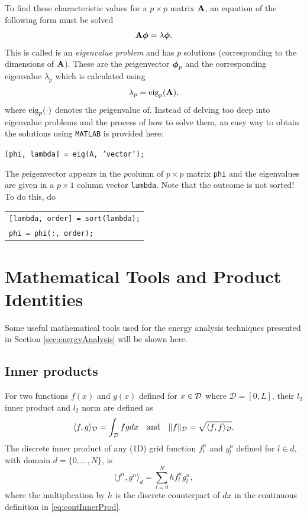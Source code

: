 To find these characteristic values for a $p\times p$ matrix $\mathbf{A}$, an equation of the following form must be solved 
\begin{equation}
    \mathbf{A} \boldsymbol{\phi} = \lambda \boldsymbol{\phi}.
\end{equation}
This is called is an \textit{eigenvalue problem} and has $p$ solutions (corresponding to the dimensions of $\mathbf{A}$). These are the $p$\th eigenvector $\boldsymbol{\phi}_p$ and the corresponding eigenvalue $\lambda_p$ which is calculated using
\begin{equation}
    \lambda_p = \text{eig}_p(\mathbf{A}),
\end{equation}
where $\text{eig}_p(\cdot)$ denotes the $p$\th eigenvalue of. Instead of delving too deep into eigenvalue problems and the process of how to solve them, an easy way to obtain the solutions using \texttt{MATLAB} is provided here:

\begin{center}
    \texttt{[phi, lambda] = eig(A, {\color[HTML]{A100F4}'vector'});}
\end{center}
The $p$\th eigenvector appears in the $p$\th column of $p\times p$ matrix \texttt{phi} and the eigenvalues are given in a $p \times 1$ column vector \texttt{lambda}. Note that the outcome is not sorted! To do this, do 
%
\begin{center}
    \begin{tabular}{l}
    \texttt{[lambda, order] = sort(lambda);}\\
    \texttt{phi = phi(:, order);}
    \end{tabular}
\end{center}

\section{Mathematical Tools and Product Identities}
Some useful mathematical tools used for the energy analysis techniques presented in Section \ref{sec:energyAnalysis} will be shown here.

\subsection{Inner products}
For two functions $f(x)$ and $g(x)$ defined for $x\in\mathcal{D}$ where $\mathcal{D} = [0,L]$, their $l_2$ inner product and $l_2$ norm are defined as
\begin{equation}\label{eq:contInnerProd}
    \langle f, g\rangle_{\mathcal{D}} = \int_{\mathcal{D}} fg dx \quad \text{and} \quad \lVert f \rVert_{\mathcal{D}} = \sqrt{\langle f, f \rangle_{\mathcal{D}}}.
\end{equation}
The discrete inner product of any (1D) grid function $f_l^n$ and $g_l^n$ defined for $l \in d$, with domain $d = \{0,\hdots,N\}$, is
\begin{equation}\label{eq:discInnerProd}
    \langle f^n, g^n \rangle_d = \sum_{l = 0}^N h f_l^n g_l^n,
\end{equation}
where the multiplication by $h$ is the discrete counterpart of $dx$ in the continuous definition in \eqref{eq:contInnerProd}. 

